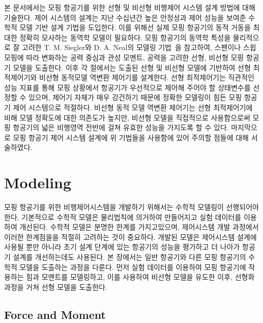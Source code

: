 \documentclass[a4paper, 12pt]{report}
\begin{document}
	본 문서에서는 모핑 항공기를 위한 선형 및 비선형 비행제어 시스템 설계 방법에 대해 기술한다.
	제어 시스템의 설계는 지난 수십년간 높은 안정성과 제어 성능을 보여준 수학적 모델 기반 설계 기법을 도입한다.
	이를 위해선 실제 모핑 항공기의 동적 거동을 최대한 정확히 모사하는 동역학 모델이 필요하다.
	모핑 항공기의 동역학 특성을 물리적으로 잘 고려한 T. M. Siegler와 D. A. Neal의 모델링 기법~\cite{seigler_modeling_2007-1}을 참고하여, 스팬이나 스윕 모핑에 따라 변화하는 공력 중심과 관성 모멘트, 공력을 고려한 선형, 비선형 모핑 항공기 모델을 도출한다.
	이후 각 절에서는 도출된 선형 및 비선형 모델에 기반하여 선형 최적제어기와 비선형 동적모델 역변환 제어기를 설계한다.
	선형 최적제어기는 직관적인 성능 지표를 통해 모핑 상황에서 항공기가 우선적으로 제어해 주어야 할 상태변수를 선정할 수 있으며, 제어기 자체가 매우 강건하기 때문에 정확한 모델링이 힘든 모핑 항공기 제어 시스템으로 적절하다.
	비선형 동적 모델 역변환 제어기는 선형 최적제어기에 비해 모델 정확도에 대한 의존도가 높지만, 비선형 모델을 직접적으로 사용함으로써 모핑 항공기의 넓은 비행영역 전반에 걸쳐 유효한 성능을 가지도록 할 수 있다.
	마지막으로 모핑 항공기 제어 시스템 설계에 위 기법들을 사용함에 있어 주의할 점들에 대해 서술하였다.
	
	\chapter{Modeling}
	
	모핑 항공기를 위한 비행제어시스템을 개발하기 위해서는 수학적 모델링이 선행되어야 한다. 
	기본적으로 수학적 모델은 물리법칙에 의거하여 만들어지고 실험 데이터를 이용하여 개선된다. 
	수학적 모델은 분명한 한계를 가지고있으며, 제어시스템 개발 과정에서 이러한 한계점을을 적절히 고려하는 것이 중요하다.
	개발된 모델은 제어시스템 설계에 사용될 뿐만 아니라 초기 설계 단계에 있는 항공기의 성능을 평가하고 더 나아가 항공기 설계를 개선하는데도 사용된다.
	본 장에서는 일반 항공기와 다른 모핑 항공기의 수학적 모델을 도출하는 과정을 다룬다.
	먼저 실험 데이터를 이용하여 모핑 항공기에 작용하는 힘과 모멘트를 모델링하고, 이를 사용하여 비선형 모델을 유도한 이후, 선형화 과정을 거쳐 선형 모델을 도출한다.
	
	\section{Force and Moment}
	
\end{document}
